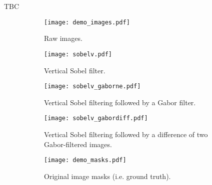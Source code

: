 \documentclass[11pt]{article} %
\begin{document}
TBC

\begin{figure}
\centering
  	 \begin{subfigure}[b]{1\textwidth}
   	\texttt{[image: demo\_images.pdf]}
   	\caption{Raw images.}
   	\label{fig:b} 
	\end{subfigure}

  	 \begin{subfigure}[b]{1\textwidth}
   	\texttt{[image: sobelv.pdf]}
   	\caption{Vertical Sobel filter.}
   	\label{fig:b} 
	\end{subfigure}
	
  	 \begin{subfigure}[b]{1\textwidth}
   	\texttt{[image: sobelv\_gaborne.pdf]}
   	\caption{Vertical Sobel filtering followed by a Gabor filter.}
   	\label{fig:d} 
	\end{subfigure}
	
	
  	 \begin{subfigure}[b]{1\textwidth}
   	\texttt{[image: sobelv\_gabordiff.pdf]}
   	\caption{Vertical Sobel filtering followed by a difference of two Gabor-filtered images.}
   	\label{fig:f} 
	\end{subfigure}
	
	\begin{subfigure}[b]{1\textwidth}
   	\texttt{[image: demo\_masks.pdf]}
   	\caption{Original image masks (i.e. ground truth).}
   	\label{fig:f} 
	\end{subfigure}
\caption{}
\label{fig:filter_process}
\end{figure}
\end{document}
